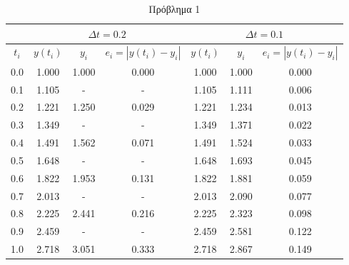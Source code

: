 \documentclass{article}
\newcommand{\en}[1]{\foreignlanguage{english}{#1}}
\begin{document}
\clearpage



\begin{table}
    \centering
    \begin{tabular}{|c|c|c|c|c|c|c|}

    \hline 
     & \multicolumn{3}{|c|}{\en{$\Delta t = 0.2$}} & \multicolumn{3}{|c|}{\en{$\Delta t = 0.1$}} \\

    \hline
    \en{$t_i$} & \en{$y(t_i)$} & \en{$y_i$} & \en{$e_i = | y(t_i) - y_i |$} & \en{$y(t_i)$} & \en{$y_i$} & \en{$e_i = | y(t_i) - y_i |$} \\

    \hline
    0.0 & 1.000 & 1.000 & 0.000 & 1.000 & 1.000 & 0.000 \\
    0.1 & 1.105 & -     & -     & 1.105 & 1.111 & 0.006 \\
    0.2 & 1.221 & 1.250 & 0.029 & 1.221 & 1.234 & 0.013 \\
    0.3 & 1.349 & -     & -     & 1.349 & 1.371 & 0.022 \\
    0.4 & 1.491 & 1.562 & 0.071 & 1.491 & 1.524 & 0.033 \\
    0.5 & 1.648 & -     & -     & 1.648 & 1.693 & 0.045 \\
    0.6 & 1.822 & 1.953 & 0.131 & 1.822 & 1.881 & 0.059 \\
    0.7 & 2.013 & -     & -     & 2.013 & 2.090 & 0.077 \\
    0.8 & 2.225 & 2.441 & 0.216 & 2.225 & 2.323 & 0.098 \\
    0.9 & 2.459 & -     & -     & 2.459 & 2.581 & 0.122 \\
    1.0 & 2.718 & 3.051 & 0.333 & 2.718 & 2.867 & 0.149 \\
    \hline

    \end{tabular}
    \caption{Πρόβλημα 1}
\end{table}
\end{document}
